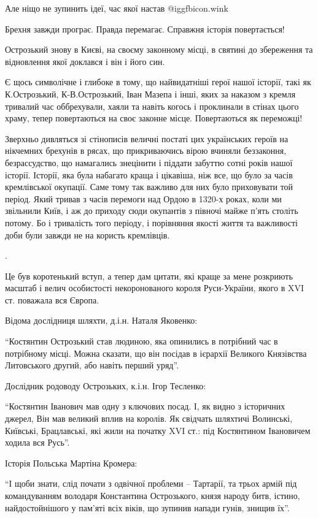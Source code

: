 Але ніщо не зупинить ідеї, час якої настав  @igg{fbicon.wink}  

Брехня завжди програє. Правда перемагає. Справжня історія повертається!

Острозький знову в Києві, на своєму законному місці, в святині до збереження та
відновлення якої доклався і він і його син. 

Є щось символічне і глибоке в тому, що найвидатніші герої нашої історії, такі
як К.Острозький, К-В.Острозький, Іван Мазепа і інші, яких за наказом з кремля
тривалий час оббрехували, хаяли та навіть когось і проклинали в стінах цього
храму, тепер повертаються на своє законне місце. Повертаються як переможці!

Зверхньо дивляться зі стінописів величні постаті цих українських героїв на
нікчемних брехунів в рясах, що прикриваючись вірою вчиняли беззаконня,
безрассудство, що намагались знецінити і піддати забуттю сотні років нашої
історії. Історії, яка була набагато краща і цікавіша, ніж все, що було за часів
кремлівської окупації. Саме тому так важливо для них було приховувати той
період. Який тривав з часів перемоги над Ордою в 1320-х роках, коли ми
звільнили Київ, і аж до приходу сюди окупантів з півночі майже п’ять століть
потому. Бо і тривалість того періоду, і порівняння якості життя та важливості
доби були завжди не на користь кремлівців.

.

Це був коротенький вступ, а тепер дам цитати, які краще за мене розкриють
масштаб і велич особистості некоронованого короля Руси-України, якого в XVI ст.
поважала вся Європа.

Відома дослідниця шляхти, д.і.н. Наталя Яковенко:

\enquote{Костянтин Острозький став людиною, яка опинились в потрібний час в потрібному
місці. Можна сказати, що він посідав в ієрархії Великого Князівства Литовського
другий, або навіть перший уряд}.

Дослідник родоводу Острозьких, к.і.н. Ігор Тесленко:

\enquote{Костянтин Іванович мав одну з ключових посад. І, як видно з історичних джерел,
Він мав великий вплив на королів. Як свідчать шляхтичі Волинські, Київські,
Брацлавські, які жили на початку XVI ст.: під Костянтином Івановичем ходила вся
Русь}.

Історія Польська Мартіна Кромера:

\enquote{І щоби знати, слід почати з одвічної проблеми – Тартарії, та трьох армій під
командуванням володаря Константина Острозького, князя народу битв, істино,
найдостойнішого у пам’яті всіх віків, що зупинив напади гунів, знищив їх}.


